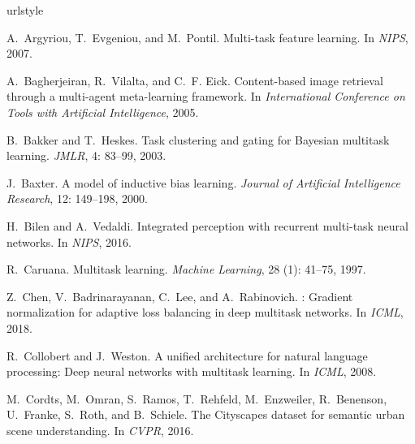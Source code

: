 \documentclass{article}
\begin{document}
\clearpage

{\small


\begin{thebibliography}{60}
\providecommand{\natexlab}[1]{#1}
\providecommand{\url}[1]{\texttt{#1}}
\expandafter\ifx\csname urlstyle\endcsname\relax
  \providecommand{\doi}[1]{doi: #1}\else
  \providecommand{\doi}{doi: \begingroup \urlstyle{rm}\Url}\fi

A.~Argyriou, T.~Evgeniou, and M.~Pontil.
\newblock Multi-task feature learning.
\newblock In \emph{NIPS}, 2007.

A.~Bagherjeiran, R.~Vilalta, and C.~F. Eick.
\newblock Content-based image retrieval through a multi-agent meta-learning
  framework.
\newblock In \emph{International Conference on Tools with Artificial
  Intelligence}, 2005.

B.~Bakker and T.~Heskes.
\newblock Task clustering and gating for {Bayesian} multitask learning.
\newblock \emph{JMLR}, 4: 83--99, 2003.

J.~Baxter.
\newblock A model of inductive bias learning.
\newblock \emph{Journal of Artificial Intelligence Research}, 12:
  149--198, 2000.

H.~Bilen and A.~Vedaldi.
\newblock Integrated perception with recurrent multi-task neural networks.
\newblock In \emph{NIPS}, 2016.

R.~Caruana.
\newblock Multitask learning.
\newblock \emph{Machine Learning}, 28 (1): 41--75, 1997.

Z.~Chen, V.~Badrinarayanan, C.~Lee, and A.~Rabinovich.
: Gradient normalization for adaptive loss balancing in
  deep multitask networks.
\newblock In \emph{{ICML}}, 2018.

R.~Collobert and J.~Weston.
\newblock A unified architecture for natural language processing: Deep neural
  networks with multitask learning.
\newblock In \emph{ICML}, 2008.

M.~Cordts, M.~Omran, S.~Ramos, T.~Rehfeld, M.~Enzweiler, R.~Benenson,
  U.~Franke, S.~Roth, and B.~Schiele.
\newblock The {Cityscapes} dataset for semantic urban scene understanding.
\newblock In \emph{{CVPR}}, 2016.


\end{thebibliography}}
\end{document}
